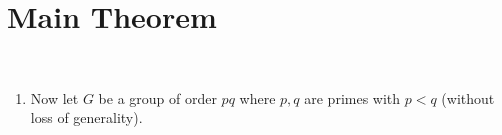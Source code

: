 \section{Main Theorem}~\label{sec:main-theorem}

\begin{Answer}
  \begin{enumerate}
    \item Now let $G$ be a group of order $pq$ where $p,q$ are primes with $p < q$ 
    (without loss of generality).  

\end{enumerate}
\end{Answer}
